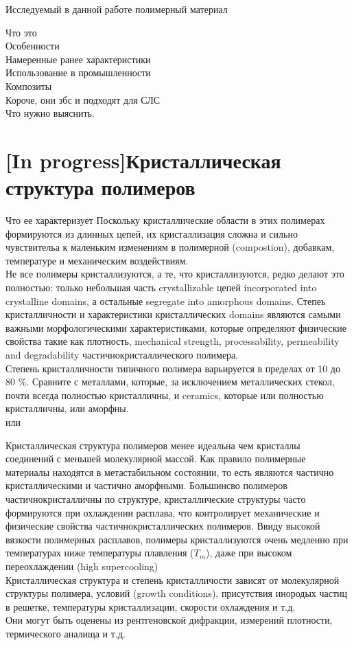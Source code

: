 Исследуемый в данной работе полимерный материал 


Что это\\
Особенности\\
Намеренные ранее характеристики\\
Использование в промышленности\\
Композиты\\
Короче, они збс и подходят для СЛС\\
Что нужно выяснить.\\

\section{[In progress]Кристаллическая структура полимеров}

Что ее характеризует
Поскольку кристаллические области в этих полимерах формируются из длинных цепей, их кристаллизация сложна и сильно чувствительа к маленьким изменениям в полимерной (compostion), добавкам, температуре и механическим воздействиям.\\
Не все полимеры кристаллизуются, а те, что кристаллизуются, редко делают это полностью: только небольшая часть crystallizable цепей incorporated into crystalline domains, а остальные segregate into amorphous domains. Степеь кристалличности и характеристики кристаллических domains являются самыми важными морфологическими характеристиками, которые определяют физические свойства такие как плотность, mechanical strength, processability, permeability and degradability частичнокристаллического полимера.\\
Степень кристалличности типичного полимера варьируется в пределах от 10 до 80 \%. Сравните с металлами, которые, за исключением металлических стекол, почти всегда полностью кристалличны, и ceramics, которые или полностью кристалличны, или аморфны.\\ \cite{cryst3} или \cite{cryst1}






Кристаллическая структура полимеров менее идеальна чем кристаллы соединений с меньшей молекулярной массой. Как правило полимерные материалы находятся в метастабильном состоянии, то есть являются частично кристаллическими и частично аморфными. Большинсво полимеров частичнокристалличны по структуре, кристаллические структуры часто формируются при охлаждении расплава, что контролирует механические и физические свойства частичнокристаллических полимеров. Ввиду высокой вязкости полимерных расплавов, полимеры кристаллизуются очень медленно при температурах ниже температуры плавления ($T_m$), даже при высоком переохлаждении (high supercooling)
\\
Кристаллическая структура и степень кристалличости зависят от молекулярной структуры полимера, условий (growth
conditions), присутствия инородых частиц в решетке, температуры кристаллизации, скорости охлаждения и т.д.\\
Они могут быть оценены из рентгеновской дифракции, измерений плотности, термического аналища и т.д.

